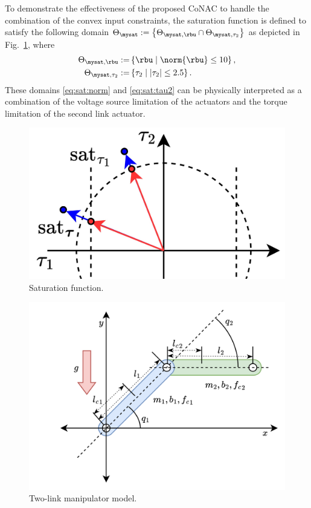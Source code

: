 \documentclass[final,5p,times,twocolumn,authoryear]{elsarticle}
\begin{document}
To demonstrate the effectiveness of the proposed CoNAC to handle the combination of the convex input constraints, the saturation function is defined to satisfy the following domain $\Theta_{\mysat}:=\left\{\Theta_{\mysat, {\rbu}}\cap\Theta_{\mysat, {\tau_2}}\right\}$ as depicted in Fig.~\ref{fig:sat}, where
%
\begin{subequations}
    \begin{align}
        \Theta_{\mysat, {\rbu}}
        :=&
        \left\{
            \rbu
            \mid
            \norm{\rbu} \le 
            10
        \right\}
        \label{eq:sat:norm}
        ,
        \\
        \Theta_{\mysat, {\tau_2}}
        :=&
        \left\{
            \tau_2
            \mid
            \vert{\tau_2}\vert \le 
            2.5
        \right\}
        .
        \label{eq:sat:tau2}
    \end{align}
    \label{eq:sat}
\end{subequations}
%
These domains \ref{eq:sat:norm} and \ref{eq:sat:tau2} can be physically interpreted as a combination of the voltage source limitation of the actuators and the torque limitation of the second link actuator.

\begin{figure}[t]
    \centering
    \includegraphics[width=0.45\linewidth]{
        src/figures/saturation.drawio.pdf
    }
    \caption{Saturation function.}
    \label{fig:sat}
\end{figure}

\begin{figure}[t]
    \centering
    \includegraphics[width=0.75\linewidth]{fig/RobotModel.drawio.png}
    \caption{Two-link manipulator model.}
    \label{fig: manipulator}
\end{figure}
\end{document}
